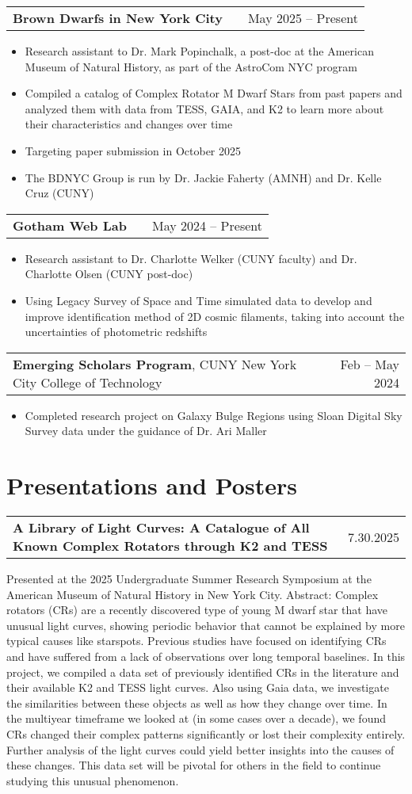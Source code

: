 \documentclass[a4paper,12pt]{article}
\makeatletter
\newenvironment{jobshort}[2]
    {
    \begin{tabularx}{\linewidth}{@{}X r@{}}
    {\raggedright\arraybackslash\nohyphens{#1}} & #2 \\[3.75pt]
    \end{tabularx}
    }
    {}
\newenvironment{joblong}[2]
    {
    \begin{tabularx}{\linewidth}{@{}l X r@{}}
    #1 & \hfill &  #2 \\[3.75pt]
    \end{tabularx}
    \begin{minipage}[t]{\linewidth}
    \begin{itemize}[nosep,after=\strut, leftmargin=1em, itemsep=3pt,label=--]
    }
    {
    \end{itemize}
    \end{minipage}    
    }
\makeatother
\begin{document}
\begin{joblong}{\textbf{Brown Dwarfs in New York City}}{May 2025 -- Present}
\item Research assistant to Dr. Mark Popinchalk, a post-doc at the American Museum of Natural History, as part of the AstroCom NYC program
\item Compiled a catalog of Complex Rotator M Dwarf Stars from past papers and analyzed them with data from TESS, GAIA, and K2 to learn more about their characteristics and changes over time
\item Targeting paper submission in October 2025
\item The BDNYC Group is run by Dr. Jackie Faherty (AMNH) and Dr. Kelle Cruz (CUNY)
\end{joblong}

\begin{joblong}{\textbf{Gotham Web Lab}}{May 2024 -- Present}
\item Research assistant to Dr. Charlotte Welker (CUNY faculty) and Dr. Charlotte Olsen (CUNY post-doc)
\item Using Legacy Survey of Space and Time simulated data to develop and improve identification method of 2D cosmic filaments, taking into account the uncertainties of photometric redshifts
\end{joblong}

\begin{joblong}{\textbf{Emerging Scholars Program}, CUNY New York City College of Technology}{Feb -- May 2024}
\item Completed research project on Galaxy Bulge Regions using Sloan Digital Sky Survey data under the guidance of Dr. Ari Maller 
\end{joblong}

\section{Presentations and Posters}
\begin{jobshort}{\textbf{A Library of Light Curves: A Catalogue of All Known Complex Rotators through K2 and TESS}}{7.30.2025}
Presented at the 2025 Undergraduate Summer Research Symposium at the American Museum of Natural History in New York City. Abstract: Complex rotators (CRs) are a recently discovered type of young M dwarf star that have unusual light curves, showing periodic behavior that cannot be explained by more typical causes like starspots. Previous studies have focused on identifying CRs and have suffered from a lack of observations over long temporal baselines. In this project, we compiled a data set of previously identified CRs in the literature and their available K2 and TESS light curves. Also using Gaia data, we investigate the similarities between these objects as well as how they change over time. In the multiyear timeframe we looked at (in some cases over a decade), we found CRs changed their complex patterns significantly or lost their complexity entirely. Further analysis of the light curves could yield better insights into the causes of these changes. This data set will be pivotal for others in the field to continue studying this unusual phenomenon.
\end{jobshort}
\end{document}

